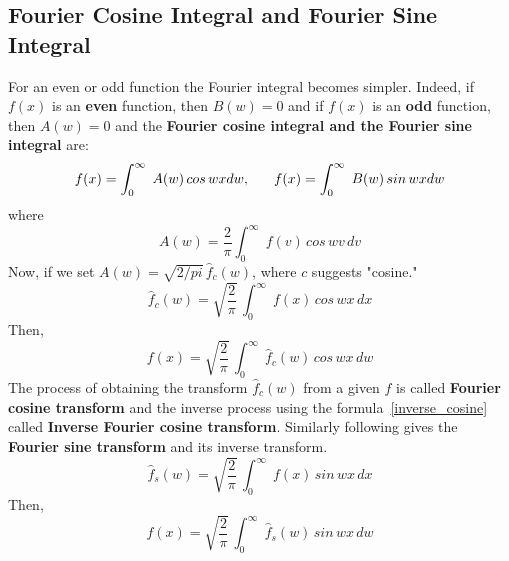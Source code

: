 \documentclass[aima331_lecturenotes_ku.tex]{subfiles}
\begin{document}
\subsection{Fourier Cosine Integral and Fourier Sine Integral}
For an even or odd function the Fourier integral becomes simpler. Indeed, if $f(x)$ is an \textbf{even} function, then $B(w)=0$ and if $f(x)$ is an \textbf{odd} function, then $A(w)=0$  and the \textbf{Fourier cosine integral and the Fourier sine integral} are:
\begin{equation}
  \label{fourier_cosine}
f(x) = \int_0^{\infty} \; A(w)\, cos\,wx dw, \hspace{6mm} f(x) = \int_0^{\infty} \; B(w)\, sin\,wx dw
\end{equation}
where
\begin{equation*}
    A(w) = \frac{2}{\pi} \int_0^{\infty} \; f(v)\,cos\,wv\,dv
  \end{equation*}
  Now, if we set $A(w) = \sqrt{2/pi}\, \hat{f}_c(w)$, where $c$ suggests "cosine."
  \begin{equation}
    \label{cosine}
    \hat{f}_c(w) = \sqrt{\frac{2}{\pi}} \, \int_0^{\infty} \; f(x)\,cos\,wx\,dx
  \end{equation}
  Then,
  \begin{equation}
    \label{inverse_cosine}
    f(x)=\sqrt{\frac{2}{\pi}} \, \int_0^{\infty} \; \hat{f}_c(w) \,cos\,wx\,dw
  \end{equation}
  The process of obtaining the transform $\hat{f}_c(w)$ from a given $f$ is called \textbf{Fourier cosine transform} and the inverse process using the formula~\ref{inverse_cosine} called \textbf{Inverse Fourier cosine transform}. Similarly following gives the \textbf{Fourier sine transform} and its inverse transform.
    \begin{equation}
    \label{sine}
    \hat{f}_s(w) = \sqrt{\frac{2}{\pi}} \, \int_0^{\infty} \; f(x)\,sin\,wx\,dx
  \end{equation}
  Then,
  \begin{equation}
    \label{inverse_sine}
    f(x)=\sqrt{\frac{2}{\pi}} \, \int_0^{\infty} \; \hat{f}_s(w) \,sin\,wx\,dw
  \end{equation}
\end{document}
